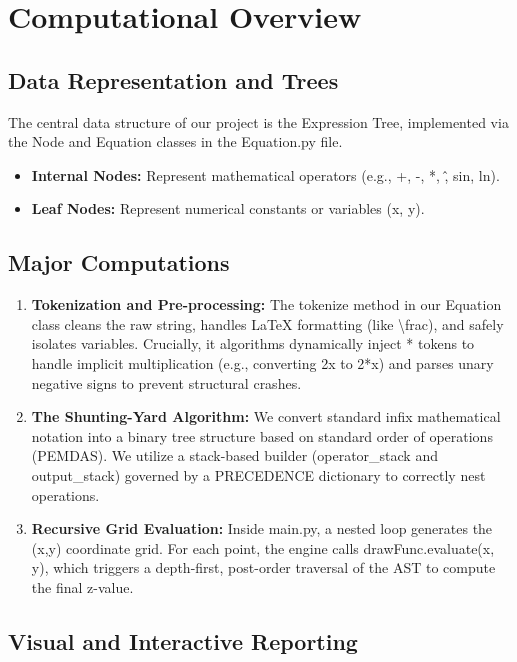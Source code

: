 \documentclass{article}
\begin{document}
\section{\textbf{Computational Overview}}

\subsection{\textbf{Data Representation and Trees}}

The central data structure of our project is the Expression Tree, implemented via the Node and Equation classes in the Equation.py file.

\begin{itemize}
    \item \textbf{Internal Nodes:} Represent mathematical operators (e.g., +, -, *, \^, sin, ln).
    \item \textbf{Leaf Nodes:} Represent numerical constants or variables (x, y).
\end{itemize}

\subsection{\textbf{Major Computations}}

\begin{enumerate}
    \item \textbf{Tokenization and Pre-processing:} The tokenize method in our Equation class cleans the raw string, handles LaTeX formatting (like \textbackslash{}frac), and safely isolates variables. Crucially, it algorithms dynamically inject * tokens to handle implicit multiplication (e.g., converting 2x to 2*x) and parses unary negative signs to prevent structural crashes.
    \item \textbf{The Shunting-Yard Algorithm:} We convert standard infix mathematical notation into a binary tree structure based on standard order of operations (PEMDAS). We utilize a stack-based builder (operator\_stack and output\_stack) governed by a PRECEDENCE dictionary to correctly nest operations.
    \item \textbf{Recursive Grid Evaluation:} Inside main.py, a nested loop generates the (x,y) coordinate grid. For each point, the engine calls drawFunc.evaluate(x, y), which triggers a depth-first, post-order traversal of the AST to compute the final z-value.
\end{enumerate}

\subsection{\textbf{Visual and Interactive Reporting}}
\end{document}

